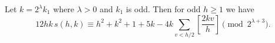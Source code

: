 Let $k = 2^{\lambda}k_1$ where $\lambda > 0$ and $k_1$ is odd. Then for odd $h \geq 1$ we have
$$12hk\,s(h, k) \equiv h^2 + k^2 + 1 + 5k - 4k \sum_{v < h/2} \left[ \frac{2kv}{h} \right] \pmod{2^{\lambda+3}}.$$
